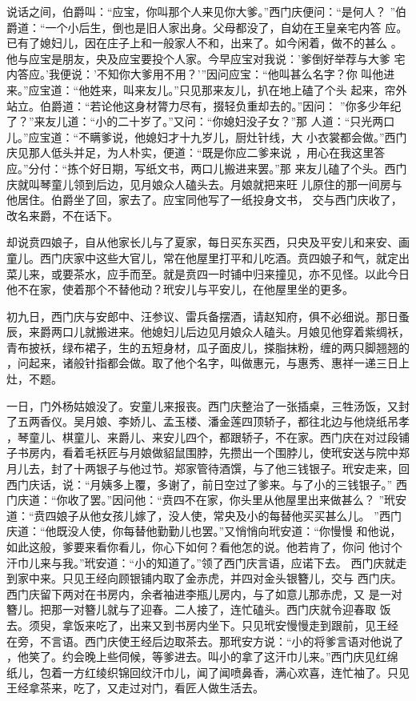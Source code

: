 说话之间，伯爵叫：“应宝，你叫那个人来见你大爹。”西门庆便问：“是何人？
”伯爵道：“一个小后生，倒也是旧人家出身。父母都没了，自幼在王皇亲宅内答
应。已有了媳妇儿，因在庄子上和一般家人不和，出来了。如今闲着，做不的甚么
。他与应宝是朋友，央及应宝要投个人家。今早应宝对我说：'爹倒好举荐与大爹
宅内答应。'我便说：'不知你大爹用不用？'”因问应宝：“他叫甚么名字？你
叫他进来。”应宝道：“他姓来，叫来友儿。”只见那来友儿，扒在地上磕了个头
起来，帘外站立。伯爵道：“若论他这身材膂力尽有，掇轻负重却去的。”因问：
”你多少年纪了？”来友儿道：“小的二十岁了。”又问：“你媳妇没子女？”那
人道：“只光两口儿。”应宝道：“不瞒爹说，他媳妇才十九岁儿，厨灶针线，大
小衣裳都会做。”西门庆见那人低头并足，为人朴实，便道：“既是你应二爹来说
，用心在我这里答应。”分付：“拣个好日期，写纸文书，两口儿搬进来罢。”那
来友儿磕了个头。西门庆就叫琴童儿领到后边，见月娘众人磕头去。月娘就把来旺
儿原住的那一间房与他居住。伯爵坐了回，家去了。应宝同他写了一纸投身文书，
交与西门庆收了，改名来爵，不在话下。

却说贲四娘子，自从他家长儿与了夏家，每日买东买西，只央及平安儿和来安、画
童儿。西门庆家中这些大官儿，常在他屋里打平和儿吃酒。贲四娘子和气，就定出
菜儿来，或要茶水，应手而至。就是贲四一时铺中归来撞见，亦不见怪。以此今日
他不在家，使着那个不替他动？玳安儿与平安儿，在他屋里坐的更多。

初九日，西门庆与安郎中、汪参议、雷兵备摆酒，请赵知府，俱不必细说。那日蚤
辰，来爵两口儿就搬进来。他媳妇儿后边见月娘众人磕头。月娘见他穿着紫绸袄，
青布披袄，绿布裙子，生的五短身材，瓜子面皮儿，搽脂抹粉，缠的两只脚翘翘的
，问起来，诸般针指都会做。取了他个名字，叫做惠元，与惠秀、惠祥一递三日上
灶，不题。

一日，门外杨姑娘没了。安童儿来报丧。西门庆整治了一张插桌，三牲汤饭，又封
了五两香仪。吴月娘、李娇儿、孟玉楼、潘金莲四顶轿子，都往北边与他烧纸吊孝
，琴童儿、棋童儿、来爵儿、来安儿四个，都跟轿子，不在家。西门庆在对过段铺
子书房内，看着毛袄匠与月娘做貂鼠围脖，先攒出一个围脖儿，使玳安送与院中郑
月儿去，封了十两银子与他过节。郑家管待酒馔，与了他三钱银子。玳安走来，回
西门庆话，说：“月姨多上覆，多谢了，前日空过了爹来。与了小的三钱银子。”
西门庆道：“你收了罢。”因问他：“贲四不在家，你头里从他屋里出来做甚么？
”玳安道：“贲四娘子从他女孩儿嫁了，没人使，常央及小的每替他买买甚么儿。
”西门庆道：“他既没人使，你每替他勤勤儿也罢。”又悄悄向玳安道：“你慢慢
和他说，如此这般，爹要来看你看儿，你心下如何？看他怎的说。他若肯了，你问
他讨个汗巾儿来与我。”玳安道：“小的知道了。”领了西门庆言语，应诺下去。
西门庆就走到家中来。只见王经向顾银铺内取了金赤虎，并四对金头银簪儿，交与
西门庆。西门庆留下两对在书房内，余者袖进李瓶儿房内，与了如意儿那赤虎，又
是一对簪儿。把那一对簪儿就与了迎春。二人接了，连忙磕头。西门庆就令迎春取
饭去。须臾，拿饭来吃了，出来又到书房内坐下。只见玳安慢慢走到跟前，见王经
在旁，不言语。西门庆使王经后边取茶去。那玳安方说：“小的将爹言语对他说了
，他笑了。约会晚上些伺候，等爹进去。叫小的拿了这汗巾儿来。”西门庆见红绵
纸儿，包着一方红绫织锦回纹汗巾儿，闻了闻喷鼻香，满心欢喜，连忙袖了。只见
王经拿茶来，吃了，又走过对门，看匠人做生活去。

